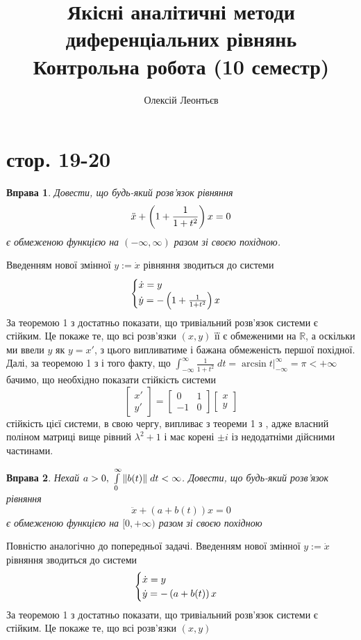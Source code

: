 \documentclass[12pt]{article} %
\title{
Якісні аналітичні методи диференціальних рівнянь\\
Контрольна робота (10 семестр)\\}
\author{Олексій Леонтьєв}
\newtheorem{prob}{Вправа}
\begin{document}
\maketitle
\section{стор. 19-20}
\begin{prob}Довести, що будь-який розв’язок рівняння \[\ddot{x}+\left(1+\frac{1}{1+t^2}\right)x=0\]є обмеженою функцією на $(-\infty,\infty)$
разом зі своєю похідною.\end{prob}
Введенням нової змінної $y:=\dot{x}$ рівняння зводиться до системи
\[\begin{cases}\dot{x}=y\\\dot{y}=-\left(1+\frac{1}{1+t^2}\right)x\end{cases}\]
За теоремою 1 з \cite[\S7]{demidovich} достатньо показати, що тривіальний розв’язок системи є стійким. Це покаже те, що всі розв’язки $(x,y)$
її є обмеженими на $\mathbb{R}$, а оскільки ми ввели $y$ як $y=x'$, з цього випливатиме і бажана обмеженість першої похідної. Далі, за теоремою
1 з \cite[\S12]{demidovich} і того факту, що $\int_{-\infty}^\infty\frac{1}{1+t^2}\;dt=\arcsin t\big|_{-\infty}^\infty=\pi<+\infty$ бачимо, що
необхідно показати стійкість системи
\[\begin{bmatrix}x'\\y'\end{bmatrix}=\begin{bmatrix}0&1\\-1&0\end{bmatrix}\begin{bmatrix}x\\y\end{bmatrix}\]
стійкість цієї системи, в свою чергу, випливає з теореми 1 з \cite[\S8]{demidovich}, адже власний поліном матриці вище рівний $\lambda^2+1$
і має корені $\pm i$ із недодатніми дійсними частинами.
\begin{prob}Нехай $a>0,\;\int_0^\infty\mynorm{b(t)}\;dt<\infty$. Довести, що будь-який розв’язок рівняння 
	\[\ddot{x}+(a+b(t))x=0\] є обмеженою функцією на $[0,+\infty)$ разом зі своєю похідною\end{prob}
Повністю аналогічно до попередньої задачі. 
Введенням нової змінної $y:=\dot{x}$ рівняння зводиться до системи
\[\begin{cases}\dot{x}=y\\\dot{y}=-\left(a+b(t)\right)x\end{cases}\]
За теоремою 1 з \cite[\S7]{demidovich} достатньо показати, що тривіальний розв’язок системи є стійким. Це покаже те, що всі розв’язки $(x,y)$
\end{document}
